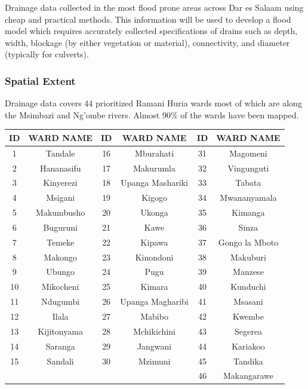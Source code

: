 \documentclass[a4paper,12pt,twoside]{article}
\begin{document}
Drainage data collected in the most flood prone areas across Dar es Salaam using cheap  and practical methods. This information will be used to develop a flood model which requires accurately collected specifications of drains such as depth, width, blockage (by either vegetation or material), connectivity, and diameter (typically for culverts).

\subsubsection{Spatial Extent}
Drainage data covers 44 prioritized Ramani Huria wards most of which are along the Msimbazi and Ng’ombe rivers. Almost 90\% of the wards have been mapped.

\begin{center}
\begin{tabular}{|c|c|c|c|c|c|}
\hline
ID & WARD NAME & ID & WARD NAME & ID & WARD NAME\\
\hline
1 & Tandale & 16 & Mburahati & 31 & Magomeni\\
2 & Hananasifu & 17 & Makurumla & 32 & Vingunguti\\
3 & Kinyerezi & 18 & Upanga Mashariki & 33 & Tabata\\
4 & Msigani & 19 & Kigogo & 34 & Mwananyamala\\
5 & Makumbusho & 20 & Ukonga & 35 & Kimanga\\
6 & Buguruni & 21 & Kawe & 36 & Sinza\\
7 & Temeke & 22 & Kipawa & 37 & Gongo la Mboto\\
8 & Makongo & 23 & Kinondoni & 38 & Makuburi\\
9 & Ubungo & 24 & Pugu & 39 & Manzese\\
10 & Mikocheni & 25 & Kimara & 40 & Kunduchi\\
11 & Ndugumbi & 26 & Upanga Magharibi & 41 & Msasani\\
12 & Ilala & 27 & Mabibo & 42 & Kwembe\\
13 & Kijitonyama & 28 & Mchikichini & 43 & Segerea\\
14 & Saranga & 29 & Jangwani & 44 & Kariakoo\\
15 & Sandali & 30 & Mzimuni & 45 & Tandika\\
{} & {} & {} & {} & 46 & Makangarawe\\
 \hline
\end{tabular}
\end{center}
\end{document}
